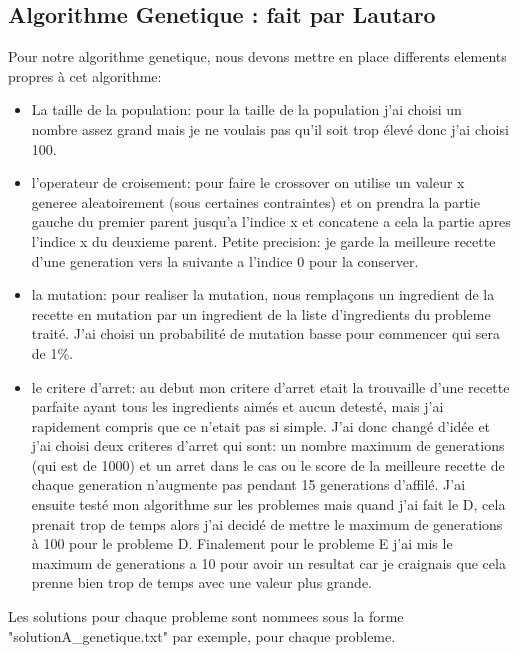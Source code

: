\documentclass{article}
\begin{document}
\subsection{Algorithme Genetique : fait par Lautaro}
    Pour notre algorithme genetique, nous devons mettre en place differents elements propres à cet algorithme:
    \begin{itemize}
        \item La taille de la population: pour la taille de la population j'ai choisi un nombre assez grand mais je ne voulais pas qu'il soit trop élevé donc j'ai choisi 100.
        \item l'operateur de croisement: pour faire le crossover on utilise un valeur x generee aleatoirement (sous certaines contraintes)
            et on prendra la partie gauche du premier parent jusqu'a l'indice x et concatene a cela la partie apres l'indice x du deuxieme parent.
            Petite precision: je garde la meilleure recette d'une generation vers la suivante a l'indice 0 pour la conserver.
        \item la mutation: pour realiser la mutation, nous remplaçons un ingredient de la recette en mutation par un ingredient de la liste d'ingredients du probleme traité.
            J'ai choisi un probabilité de mutation basse pour commencer qui sera de 1\%.
        \item le critere d'arret: au debut mon critere d'arret etait la trouvaille d'une recette parfaite ayant tous les ingredients aimés et aucun detesté,
            mais j'ai rapidement compris que ce n'etait pas si simple. J'ai donc changé d'idée et
            j'ai choisi deux criteres d'arret qui sont: un nombre maximum de generations (qui est de 1000)
            et un arret dans le cas ou le score de la meilleure recette de chaque generation n'augmente pas pendant 15 generations d'affilé.
            J'ai ensuite testé mon algorithme sur les problemes mais quand j'ai fait le D, cela prenait trop de temps alors j'ai decidé de mettre le maximum de generations à 100 pour le probleme D.
            Finalement pour le probleme E j'ai mis le maximum de generations a 10 pour avoir un resultat car je craignais que cela prenne bien trop de temps avec une valeur plus grande.
    \end{itemize}
    Les solutions pour chaque probleme sont nommees sous la forme "solutionA\_genetique.txt" par exemple, pour chaque probleme.
\end{document}
